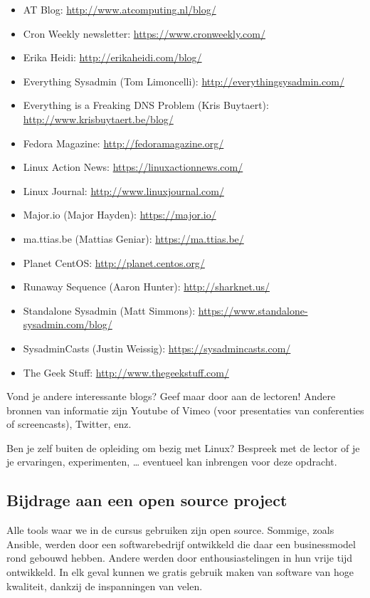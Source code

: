 \begin{itemize}
\item AT Blog: \url{http://www.atcomputing.nl/blog/}
\item Cron Weekly newsletter: \url{https://www.cronweekly.com/}
\item Erika Heidi: \url{http://erikaheidi.com/blog/}
\item Everything Sysadmin (Tom Limoncelli): \url{http://everythingsysadmin.com/}
\item Everything is a Freaking DNS Problem (Kris Buytaert): \url{http://www.krisbuytaert.be/blog/}
\item Fedora Magazine: \url{http://fedoramagazine.org/}
\item Linux Action News: \url{https://linuxactionnews.com/}
\item Linux Journal: \url{http://www.linuxjournal.com/}
\item Major.io (Major Hayden): \url{https://major.io/}
\item ma.ttias.be (Mattias Geniar): \url{https://ma.ttias.be/}
\item Planet CentOS: \url{http://planet.centos.org/}
\item Runaway Sequence (Aaron Hunter): \url{http://sharknet.us/}
\item Standalone Sysadmin (Matt Simmons): \url{https://www.standalone-sysadmin.com/blog/}
\item SysadminCasts (Justin Weissig): \url{https://sysadmincasts.com/}
\item The Geek Stuff: \url{http://www.thegeekstuff.com/}
\end{itemize}

Vond je andere interessante blogs? Geef maar door aan de lectoren! Andere bronnen van informatie zijn Youtube of Vimeo (voor presentaties van conferenties of screencasts), Twitter, enz.

Ben je zelf buiten de opleiding om bezig met Linux? Bespreek met de lector of je je ervaringen, experimenten, \ldots{} eventueel kan inbrengen voor deze opdracht.

\subsection{Bijdrage aan een open source project}
\label{subs:bijdrage-aan-een-open-source-project}

Alle tools waar we in de cursus gebruiken zijn open source. Sommige, zoals Ansible, werden door een softwarebedrijf ontwikkeld die daar een businessmodel rond gebouwd hebben. Andere werden door enthousiastelingen in hun vrije tijd ontwikkeld. In elk geval kunnen we gratis gebruik maken van software van hoge kwaliteit, dankzij de inspanningen van velen.

